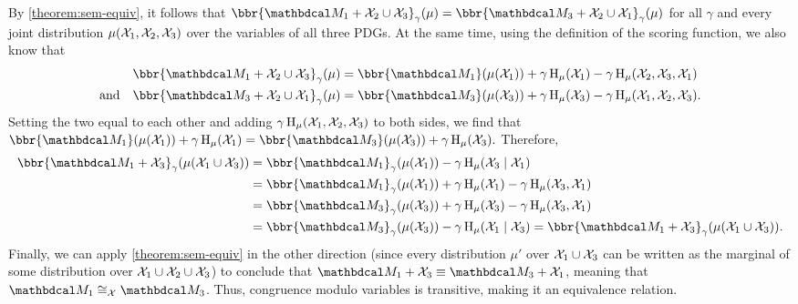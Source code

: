 \begin{subappendices}
\begin{lproof}
        By \cref{theorem:sem-equiv},
        it follows that
        $
            \bbr{\dg M_1 + \X_2 \cup \X_3}_\gamma(\mu) = 
            \bbr{\dg M_3 + \X_2 \cup \X_1}_\gamma(\mu) 
        $
        for all $\gamma$ and every joint distribution $\mu(\mathcal X_1,\mathcal X_2,\mathcal X_3)$ over the variables of all three PDGs. 
        At the same time, using the definition of the scoring function, we also know that
        \begin{align*}
            \bbr{\dg M_1 + \X_2 \cup \X_3}_\gamma(\mu) &= \bbr{\dg M_1}(\mu(\X_1))
                + \gamma \H_\mu( \X_1 )
                - \gamma \H_\mu( \X_2, \X_3, \X_1) \\ 
                     \text{and}\quad
            \bbr{\dg M_3 + \X_2 \cup \X_1}_\gamma(\mu) &= \bbr{\dg M_3}(\mu(\X_3))
                + \gamma \H_\mu(\X_3) - \gamma \H_\mu( \X_1, \X_2, \X_3).
        \end{align*}
        Setting the two equal to each other and adding $\gamma \operatorname{\mathrm{H}}_\mu(\mathcal X_1,\mathcal X_2,\mathcal X_3)$ to both sides, we find that
        $
        \bbr{\dg M_1}(\mu(\X_1))
            + \gamma \H_\mu( \X_1 ) = 
        \bbr{\dg M_3}(\mu(\X_3))
            + \gamma \H_\mu(\X_3).
        $
        Therefore,
        \begin{align*}
        \bbr{\dg M_1 + \X_3}_\gamma(\mu(\X_1\cup\X_3))
            &= \bbr{\dg M_1}_\gamma(\mu(\X_1)) - \gamma \H_\mu(\X_3 \mid \X_1) \\
            &= \bbr{\dg M_1}_\gamma(\mu(\X_1)) + \gamma \H_\mu(\X_1) - \gamma \H_\mu(\X_3, \X_1) \\
            &= \bbr{\dg M_3}_\gamma(\mu(\X_3)) + \gamma \H_\mu(\X_3) - \gamma \H_\mu(\X_3, \X_1) \\
            &= \bbr{\dg M_3}_\gamma(\mu(\X_3)) - \gamma \H_\mu(\X_1 \mid \X_3) 
            = \bbr{\dg M_1 + \X_3}_\gamma(\mu(\X_1\cup\X_3)).
        \end{align*}
        Finally, we can apply \cref{theorem:sem-equiv} in the other direction
        (since every distribution $\mu'$ over $\mathcal X_1 \cup \mathcal X_3$ can be written as the marginal of some distribution over $\mathcal X_1 \cup \mathcal X_2 \cup\mathcal X_3$)
        to conclude that $\dg M_1 + \X_3 \equiv \dg M_3 + \X_1$, meaning that
        $\dg M_1 \cong_\X \dg M_3$. Thus, congruence modulo variables is transitive, making it an equivalence relation.
    \end{lproof}
    

\end{subappendices}
